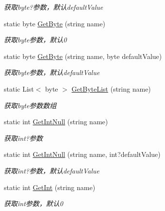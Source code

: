 \begin{DoxyCompactItemize}
\begin{DoxyCompactList}\small\item\em 获取byte?参数，默认default\-Value \end{DoxyCompactList}\item 
static byte \hyperlink{class_x_c_l_net_tools_1_1_string_hander_1_1_form_helper_aac299eb0719beba6c618deeed497fd76}{Get\-Byte} (string name)
\begin{DoxyCompactList}\small\item\em 获取byte参数，默认0 \end{DoxyCompactList}\item 
static byte \hyperlink{class_x_c_l_net_tools_1_1_string_hander_1_1_form_helper_aa1090c02b273fe23de21755a7b574a08}{Get\-Byte} (string name, byte default\-Value)
\begin{DoxyCompactList}\small\item\em 获取byte参数，默认default\-Value \end{DoxyCompactList}\item 
static List$<$ byte $>$ \hyperlink{class_x_c_l_net_tools_1_1_string_hander_1_1_form_helper_a575a372579f530e8fa7bce9a7808cf7f}{Get\-Byte\-List} (string name)
\begin{DoxyCompactList}\small\item\em 获取byte参数数组 \end{DoxyCompactList}\item 
static int \hyperlink{class_x_c_l_net_tools_1_1_string_hander_1_1_form_helper_a5f6d473bbc50e60cbd6c5015c1d4b010}{Get\-Int\-Null} (string name)
\begin{DoxyCompactList}\small\item\em 获取int?参数 \end{DoxyCompactList}\item 
static int \hyperlink{class_x_c_l_net_tools_1_1_string_hander_1_1_form_helper_a91af563c9654d78b004215b0d8cc5338}{Get\-Int\-Null} (string name, int?default\-Value)
\begin{DoxyCompactList}\small\item\em 获取int?参数，默认default\-Value \end{DoxyCompactList}\item 
static int \hyperlink{class_x_c_l_net_tools_1_1_string_hander_1_1_form_helper_ad3bcc9178dfa1bdc2d0e459b95d56fb4}{Get\-Int} (string name)
\begin{DoxyCompactList}\small\item\em 获取int参数，默认0 \end{DoxyCompactList}\item 

\end{DoxyCompactItemize}
